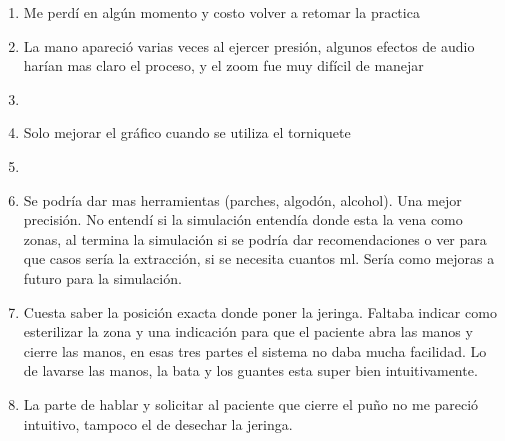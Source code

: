 \begin{enumerate}
\item Me perdí en algún momento y costo volver a retomar la practica
\item La mano apareció varias veces al ejercer presión, algunos efectos de audio
    harían mas claro el proceso, y el zoom fue muy difícil de manejar
\item 
\item Solo mejorar el gráfico cuando se utiliza el torniquete
\item 
\item Se podría dar mas herramientas (parches, algodón, alcohol). Una mejor
    precisión. No entendí si la simulación entendía donde esta la vena como
    zonas, al termina la simulación si se podría dar recomendaciones o ver para
    que casos sería la extracción, si se necesita cuantos ml. Sería como mejoras
    a futuro para la simulación.
\item Cuesta saber la posición exacta donde poner la jeringa. Faltaba indicar
    como esterilizar la zona y una indicación para que el paciente abra las
    manos y cierre las manos, en esas tres partes el sistema no daba mucha
    facilidad. Lo de lavarse las manos, la bata y los guantes esta super bien
    intuitivamente.
\item La parte de hablar y solicitar al paciente que cierre el puño no me
    pareció intuitivo, tampoco el de desechar la jeringa.
\end{enumerate}


